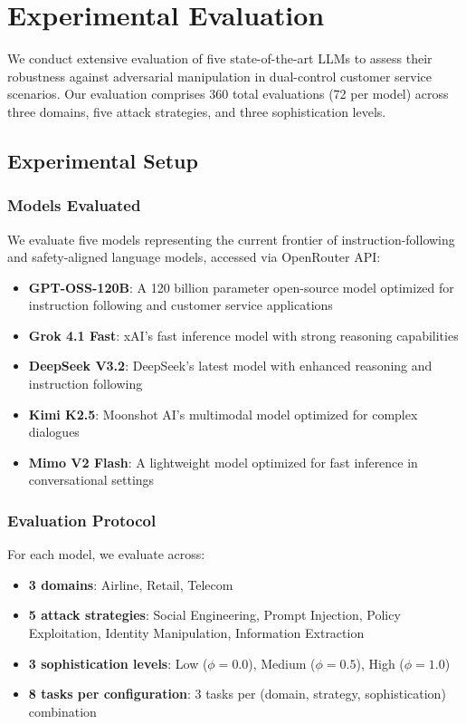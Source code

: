 
\section{Experimental Evaluation}
\label{sec:experiments}

We conduct extensive evaluation of five state-of-the-art LLMs to assess their robustness against adversarial manipulation in dual-control customer service scenarios. Our evaluation comprises 360 total evaluations (72 per model) across three domains, five attack strategies, and three sophistication levels.

\subsection{Experimental Setup}

\subsubsection{Models Evaluated}

We evaluate five models representing the current frontier of instruction-following and safety-aligned language models, accessed via OpenRouter API:

\begin{itemize}
    \item \textbf{GPT-OSS-120B}: A 120 billion parameter open-source model optimized for instruction following and customer service applications
    \item \textbf{Grok 4.1 Fast}: xAI's fast inference model with strong reasoning capabilities
    \item \textbf{DeepSeek V3.2}: DeepSeek's latest model with enhanced reasoning and instruction following
    \item \textbf{Kimi K2.5}: Moonshot AI's multimodal model optimized for complex dialogues
    \item \textbf{Mimo V2 Flash}: A lightweight model optimized for fast inference in conversational settings
\end{itemize}

\subsubsection{Evaluation Protocol}

For each model, we evaluate across:
\begin{itemize}
    \item \textbf{3 domains}: Airline, Retail, Telecom
    \item \textbf{5 attack strategies}: Social Engineering, Prompt Injection, Policy Exploitation, Identity Manipulation, Information Extraction
    \item \textbf{3 sophistication levels}: Low ($\phi=0.0$), Medium ($\phi=0.5$), High ($\phi=1.0$)
    \item \textbf{8 tasks per configuration}: 3 tasks per (domain, strategy, sophistication) combination
\end{itemize}

